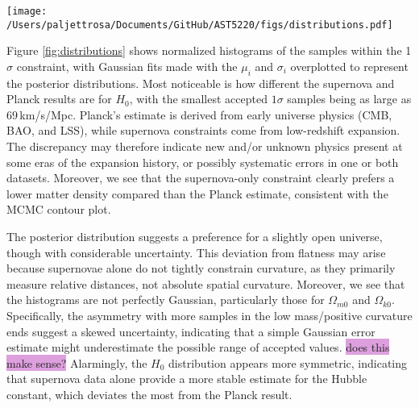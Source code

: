 \documentclass{aa}
\begin{document}

\begin{figure*}
  \centering
  \texttt{[image: /Users/paljettrosa/Documents/GitHub/AST5220/figs/distributions.pdf]}
  \caption{Histograms of the MCMC posterior distributions for the parameters $(H_0,\Omega_{m0}, \Omega_{k0}, \Omega_{\Lambda0})$, compared with Gaussian fits (solid curves) and Planck values. Deviations from Gaussianity indicate asymmetries in parameter uncertainties.}\label{fig:distributions}
\end{figure*}

Figure \ref{fig:distributions} shows normalized histograms of the samples within the 1$\sigma$ constraint, with Gaussian fits made with the $\mu_i$ and $\sigma_i$ overplotted to represent the posterior distributions. Most noticeable is how different the supernova and Planck results are for $H_0$, with the smallest accepted $1\sigma$ samples being as large as $69\,$km/s/Mpc. Planck's estimate is derived from early universe physics (CMB, BAO, and LSS), while supernova constraints come from low-redshift expansion. The discrepancy may therefore indicate new and/or unknown physics present at some eras of the expansion history, or possibly systematic errors in one or both datasets. Moreover, we see that the supernova-only constraint clearly prefers a lower matter density compared than the Planck estimate, consistent with the MCMC contour plot.

The posterior distribution suggests a preference for a slightly open universe, though with considerable uncertainty. This deviation from flatness may arise because supernovae alone do not tightly constrain curvature, as they primarily measure relative distances, not absolute spatial curvature. Moreover, we see that the histograms are not perfectly Gaussian, particularly those for $\Omega_{m0}$ and $\Omega_{k0}$. Specifically, the asymmetry with more samples in the low mass/positive curvature ends suggest a skewed uncertainty, indicating that a simple Gaussian error estimate might underestimate the possible range of accepted values. \colorbox{Plum}{does this make sense?} Alarmingly, the $H_0$ distribution appears more symmetric, indicating that supernova data alone provide a more stable estimate for the Hubble constant, which deviates the most from the Planck result.
\end{document}

